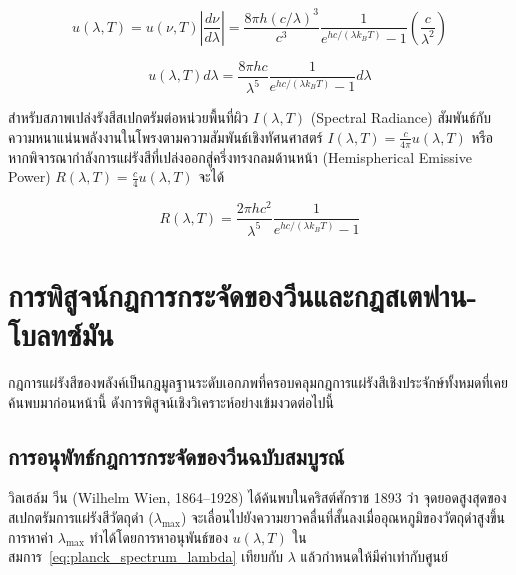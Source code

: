 \begin{equation}
u(\lambda, T) = u(\nu, T) \left| \frac{d\nu}{d\lambda} \right| = \frac{8\pi h(c/\lambda)^3}{c^3} \frac{1}{e^{hc/(\lambda k_B T)} - 1} \left( \frac{c}{\lambda^2} \right)
\end{equation}

\begin{equation}
u(\lambda, T) d\lambda = \frac{8\pi h c}{\lambda^5} \frac{1}{e^{hc/(\lambda k_B T)} - 1} d\lambda
\label{eq:planck_spectrum_lambda}
\end{equation}

สำหรับสภาพเปล่งรังสีสเปกตรัมต่อหน่วยพื้นที่ผิว $I(\lambda, T)$ (Spectral Radiance) สัมพันธ์กับความหนาแน่นพลังงานในโพรงตามความสัมพันธ์เชิงทัศนศาสตร์ $I(\lambda, T) = \frac{c}{4\pi} u(\lambda, T)$ หรือหากพิจารณากำลังการแผ่รังสีที่เปล่งออกสู่ครึ่งทรงกลมด้านหน้า (Hemispherical Emissive Power) $R(\lambda, T) = \frac{c}{4} u(\lambda, T)$ จะได้

\begin{equation}
R(\lambda, T) = \frac{2\pi h c^2}{\lambda^5} \frac{1}{e^{hc/(\lambda k_B T)} - 1}
\label{eq:planck_radiance_R}
\end{equation}

\section{การพิสูจน์กฎการกระจัดของวีนและกฎสเตฟาน-โบลทซ์มัน}

กฎการแผ่รังสีของพลังค์เป็นกฎมูลฐานระดับเอกภพที่ครอบคลุมกฎการแผ่รังสีเชิงประจักษ์ทั้งหมดที่เคยค้นพบมาก่อนหน้านี้ ดังการพิสูจน์เชิงวิเคราะห์อย่างเข้มงวดต่อไปนี้

\subsection{การอนุพัทธ์กฎการกระจัดของวีนฉบับสมบูรณ์}

วิลเฮล์ม วีน (Wilhelm Wien, 1864--1928) ได้ค้นพบในคริสต์ศักราช 1893 ว่า จุดยอดสูงสุดของสเปกตรัมการแผ่รังสีวัตถุดำ ($\lambda_{\max}$) จะเลื่อนไปยังความยาวคลื่นที่สั้นลงเมื่ออุณหภูมิของวัตถุดำสูงขึ้น การหาค่า $\lambda_{\max}$ ทำได้โดยการหาอนุพันธ์ของ $u(\lambda, T)$ ในสมการ~\eqref{eq:planck_spectrum_lambda} เทียบกับ $\lambda$ แล้วกำหนดให้มีค่าเท่ากับศูนย์

